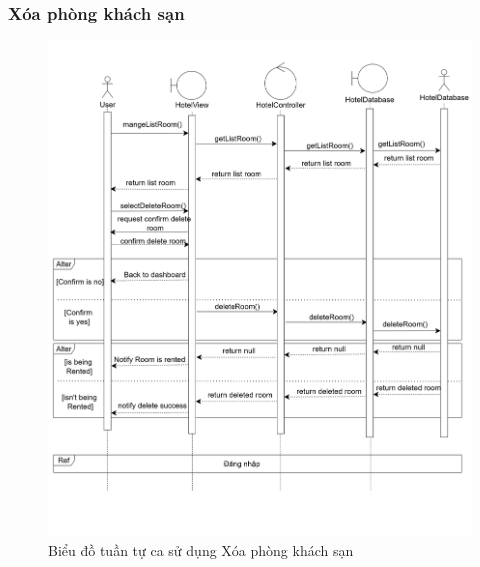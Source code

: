 \subsubsection{Xóa phòng khách sạn}
\begin{figure}[H]
    \centering
    \includegraphics[width=\textwidth]{img2/xoaphongpt.png}
    \caption{Biểu đồ tuần tự ca sử dụng Xóa phòng khách sạn}
\end{figure}

